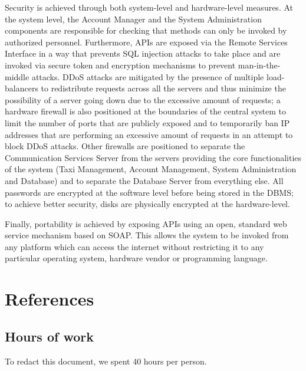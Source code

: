Security is achieved through both system-level and hardware-level measures. At the system level, the Account Manager and the System Administration components are responsible for checking that methods can only be invoked by authorized personnel. Furthermore, APIs are exposed via the Remote Services Interface in a way that prevents SQL injection attacks to take place and are invoked via secure token and encryption mechanisms to prevent man-in-the-middle attacks. DDoS attacks are mitigated by the presence of multiple load-balancers to redistribute requests across all the servers and thus minimize the possibility of a server going down due to the excessive amount of requests; a hardware firewall is also positioned at the boundaries of the central system to limit the number of ports that are publicly exposed and to temporarily ban IP addresses that are performing an excessive amount of requests in an attempt to block DDoS attacks. Other firewalls are positioned to separate the Communication Services Server from the servers providing the core functionalities of the system (Taxi Management, Account Management, System Administration and Database) and to separate the Database Server from everything else. All passwords are encrypted at the software level before being stored in the DBMS; to achieve better security, disks are physically encrypted at the hardware-level.

Finally, portability is achieved by exposing APIs using an open, standard web service mechanism based on SOAP. This allows the system to be invoked from any platform which can access the internet without restricting it to any particular operating system, hardware vendor or programming language. 

\chapter{References}

\begin{appendices}

\chapter{Hours of work}
To redact this document, we spent 40 hours per person.


\end{appendices}